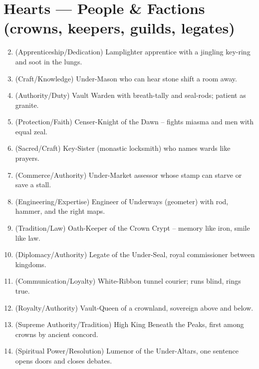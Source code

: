 \section*{Hearts --- People \& Factions (crowns, keepers, guilds, legates)}
\label{sec:aeler-people}
\begin{enumerate}
\setcounter{enumi}{1}
\item {} (Apprenticeship/Dedication) Lamplighter apprentice with a jingling key-ring and soot in the lungs.
\item {} (Craft/Knowledge) Under-Mason who can hear stone shift a room away.
\item {} (Authority/Duty) Vault Warden with breath-tally and seal-rods; patient as granite.
\item {} (Protection/Faith) Censer-Knight of the Dawn -- fights miasma and men with equal zeal.
\item {} (Sacred/Craft) Key-Sister (monastic locksmith) who names wards like prayers.
\item {} (Commerce/Authority) Under-Market assessor whose stamp can starve or save a stall.
\item {} (Engineering/Expertise) Engineer of Underways (geometer) with rod, hammer, and the right maps.
\item {} (Tradition/Law) Oath-Keeper of the Crown Crypt -- memory like iron, smile like law.
\item {} (Diplomacy/Authority) Legate of the Under-Seal, royal commissioner between kingdoms.
\item {} (Communication/Loyalty) White-Ribbon tunnel courier; runs blind, rings true.
\item {} (Royalty/Authority) Vault-Queen of a crownland, sovereign above and below.
\item {} (Supreme Authority/Tradition) High King Beneath the Peaks, first among crowns by ancient concord.
\item {} (Spiritual Power/Resolution) Lumenor of the Under-Altars, one sentence opens doors and closes debates.
\end{enumerate}

